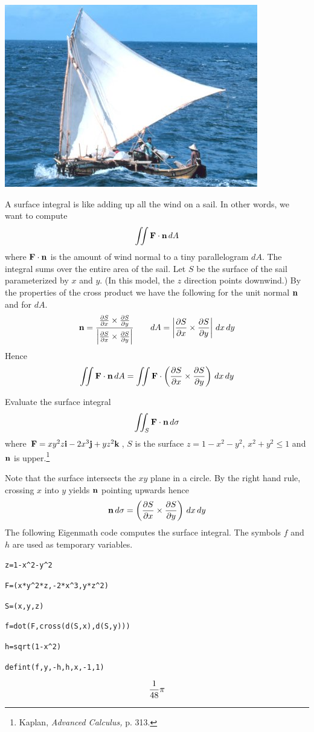 
\newpage

\begin{center}
\noindent
\includegraphics[scale=0.5]{sailboat.png}
\end{center}

\bigskip
\noindent
A surface integral is like adding up all the wind on a sail.
In other words, we want to compute
$$\int\!\!\!\int{\bf F\cdot n}\,dA$$
where ${\bf F\cdot n}$ is the amount of wind normal to a tiny parallelogram $dA$.
The integral sums over the entire area of the sail.
Let $S$ be the surface of the sail parameterized by $x$ and $y$.
(In this model, the $z$ direction points downwind.)
By the properties of the cross product we have the following for the unit normal $\bf n$
and for $dA$.
$${\bf n}={ {{\partial S\over\partial x}\times{\partial S\over\partial y}}\over
 {\left|{\partial S\over\partial x}\times{\partial S\over\partial y}\right|}}\qquad
dA=\left|{\partial S\over\partial x}\times{\partial S\over\partial y}\right|\,dx\,dy$$
Hence
$$\int\!\!\!\int{\bf F\cdot n}\,dA=\int\!\!\!\int{\bf F}\cdot
\left({{\partial S\over\partial x}\times{\partial S\over\partial y}}\right)\,dx\,dy$$

\newpage

\noindent
Evaluate the surface integral
$$\int\!\!\!\int_S{\bf F\cdot n}\,d\sigma$$
where ${\bf F}=xy^2z{\bf i}-2x^3{\bf j}+yz^2{\bf k}$, $S$ is the surface
$z=1-x^2-y^2$, $x^2+y^2\le1$ and $\bf n$ is upper.\footnote{
Kaplan, {\it Advanced Calculus,} p. 313.}

\medskip
\noindent
Note that the surface intersects the $xy$ plane in a circle.
By the right hand rule, crossing $x$ into $y$ yields $\bf n$ pointing upwards hence
$${\bf n}\,d\sigma=\left({{\partial S\over\partial x}\times{\partial S\over\partial y}}\right)\,dx\,dy$$
The following Eigenmath code computes the surface integral.
The symbols $f$ and $h$ are used as temporary variables.

\medskip
\verb$z=1-x^2-y^2$

\verb$F=(x*y^2*z,-2*x^3,y*z^2)$

\verb$S=(x,y,z)$

\verb$f=dot(F,cross(d(S,x),d(S,y)))$

\verb$h=sqrt(1-x^2)$

\verb$defint(f,y,-h,h,x,-1,1)$

$${1\over48}\pi$$

